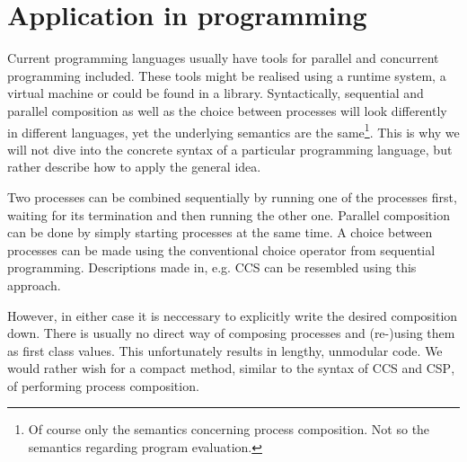 
\section{Application in programming}
Current programming languages usually have tools for parallel and concurrent programming included. These tools might be realised using a runtime system, a virtual machine or could be found in a library. Syntactically, sequential and parallel composition as well as the choice between processes will look differently in different languages, yet the underlying semantics are the same\footnote{Of course only the semantics concerning process composition. Not so the semantics regarding program evaluation.}. This is why we will not dive into the concrete syntax of a particular programming language, but rather describe how to apply the general idea.

Two processes can be combined sequentially by running one of the processes first, waiting for its termination and then running the other one. Parallel composition can be done by simply starting processes at the same time. A choice between processes can be made using the conventional choice operator from sequential programming. Descriptions made in, e.g. \textsc{CCS} can be resembled using this approach.

However, in either case it is neccessary to explicitly write the desired composition down. There is usually no direct way of composing processes and (re-)using them as first class values. This unfortunately results in lengthy, unmodular code. We would rather wish for a compact method, similar to the syntax of \textsc{CCS} and \textsc{CSP}, of performing process composition.